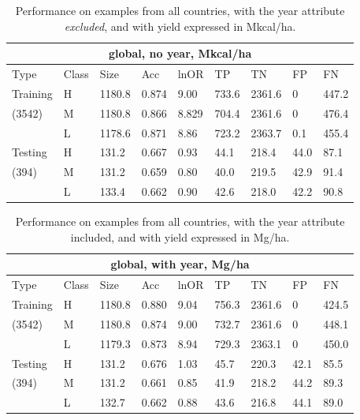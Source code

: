 \documentclass[11pt]{article}
\begin{document}
\begin{table}[h!]
\centering
\begin{tabular}{lllllllll}
\toprule
\multicolumn{9}{c}{\textbf{global, no year, Mkcal/ha}} \\
\midrule
Type & Class & Size & Acc & lnOR & TP & TN & FP & FN \\
\midrule
Training & H & 1180.8 & 0.874 & 9.00 & 733.6 & 2361.6 & 0 & 447.2  \\
(3542) & M & 1180.8 & 0.866 & 8.829 & 704.4 & 2361.6 & 0 & 476.4  \\
& L & 1178.6 & 0.871 & 8.86 & 723.2 & 2363.7 & 0.1 & 455.4  \\
Testing & H & 131.2 & 0.667 & 0.93 & 44.1 & 218.4 & 44.0 & 87.1  \\
(394) & M & 131.2 & 0.659 & 0.80 & 40.0 & 219.5 & 42.9 & 91.4  \\
& L & 133.4 & 0.662 & 0.90 & 42.6 & 218.0 & 42.2 & 90.8  \\
\bottomrule
\end{tabular}
\caption{Performance on examples from all countries, with the year attribute \emph{excluded}, and with yield expressed in Mkcal/ha.}
\label{k.ny.wt_results}
\end{table}

\begin{table}[h!]
\centering
\begin{tabular}{lllllllll}
\toprule
\multicolumn{9}{c}{\textbf{global, with year, Mg/ha}} \\
\midrule
Type & Class & Size & Acc & lnOR & TP & TN & FP & FN \\
\midrule
Training & H & 1180.8 & 0.880 & 9.04 & 756.3 & 2361.6 & 0 & 424.5  \\
(3542) & M & 1180.8 & 0.874 & 9.00 & 732.7 & 2361.6 & 0 & 448.1  \\
& L & 1179.3 & 0.873 & 8.94 & 729.3 & 2363.1 & 0 & 450.0  \\
Testing & H & 131.2 & 0.676 & 1.03 & 45.7 & 220.3 & 42.1 & 85.5  \\
(394) & M & 131.2 & 0.661 & 0.85 & 41.9 & 218.2 & 44.2 & 89.3  \\
& L & 132.7 & 0.662 & 0.88 & 43.6 & 216.8 & 44.1 & 89.0  \\
\bottomrule
\end{tabular}
\caption{Performance on examples from all countries, with the year attribute included, and with yield expressed in Mg/ha.}
\label{t.wy.wt_results}
\end{table}
\end{document}

